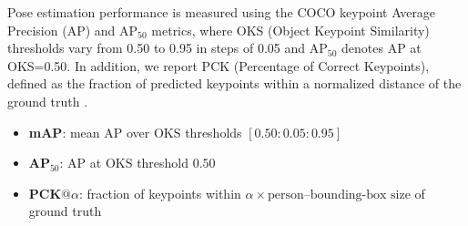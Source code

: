 Pose estimation performance is measured using the COCO keypoint Average Precision (AP) and AP$_{50}$ metrics, where OKS (Object Keypoint Similarity) thresholds vary from 0.50 to 0.95 in steps of 0.05 and AP$_{50}$ denotes AP at OKS=0.50.  In addition, we report PCK (Percentage of Correct Keypoints), defined as the fraction of predicted keypoints within a normalized distance of the ground truth \cite{Dubey2023PoseSurvey}.  
\begin{itemize}
  \item \textbf{mAP}: mean AP over OKS thresholds $[0.50:0.05:0.95]$  
  \item \textbf{AP$_{50}$}: AP at OKS threshold $0.50$  
  \item \textbf{PCK}@$\alpha$: fraction of keypoints within $\alpha \times \text{person–bounding-box size}$ of ground truth  
\end{itemize}
